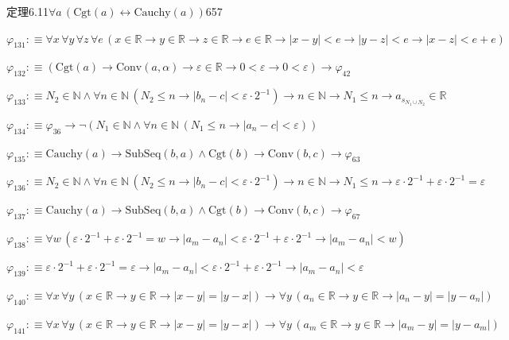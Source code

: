 \begin{fullproof}{定理6.11}{$\forall a\,(\mathrm{Cgt}(a) \leftrightarrow \mathrm{Cauchy}(a))$}{657}
\begin{abbrevlist}
\item $\varphi_{131} :\equiv \forall x\,\forall y\,\forall z\,\forall e\,(x \in \mathbb{R} \to y \in \mathbb{R} \to z \in \mathbb{R} \to e \in \mathbb{R} \to \lvert x - y \rvert < e \to \lvert y - z \rvert < e \to \lvert x - z \rvert < e + e)$
\item $\varphi_{132} :\equiv (\mathrm{Cgt}(a) \to \mathrm{Conv}(a,\alpha) \to \varepsilon \in \mathbb{R} \to 0 < \varepsilon \to 0 < \varepsilon) \to \varphi_{42}$
\item $\varphi_{133} :\equiv N_{2} \in \mathbb{N} \land \forall n \in \mathbb{N}\,(N_{2} \leq n \to \lvert b_{n} - c \rvert < \varepsilon \cdot 2^{-1}) \to n \in \mathbb{N} \to N_{1} \leq n \to a_{s_{N_{1} \cup N_{2}}} \in \mathbb{R}$
\item $\varphi_{134} :\equiv \varphi_{36} \to \neg (N_{1} \in \mathbb{N} \land \forall n \in \mathbb{N}\,(N_{1} \leq n \to \lvert a_{n} - c \rvert < \varepsilon))$
\item $\varphi_{135} :\equiv \mathrm{Cauchy}(a) \to \mathrm{SubSeq}(b,a) \land \mathrm{Cgt}(b) \to \mathrm{Conv}(b,c) \to \varphi_{63}$
\item $\varphi_{136} :\equiv N_{2} \in \mathbb{N} \land \forall n \in \mathbb{N}\,(N_{2} \leq n \to \lvert b_{n} - c \rvert < \varepsilon \cdot 2^{-1}) \to n \in \mathbb{N} \to N_{1} \leq n \to \varepsilon \cdot 2^{-1} + \varepsilon \cdot 2^{-1} = \varepsilon$
\item $\varphi_{137} :\equiv \mathrm{Cauchy}(a) \to \mathrm{SubSeq}(b,a) \land \mathrm{Cgt}(b) \to \mathrm{Conv}(b,c) \to \varphi_{67}$
\item $\varphi_{138} :\equiv \forall w\,(\varepsilon \cdot 2^{-1} + \varepsilon \cdot 2^{-1} = w \to \lvert a_{m} - a_{n} \rvert < \varepsilon \cdot 2^{-1} + \varepsilon \cdot 2^{-1} \to \lvert a_{m} - a_{n} \rvert < w)$
\item $\varphi_{139} :\equiv \varepsilon \cdot 2^{-1} + \varepsilon \cdot 2^{-1} = \varepsilon \to \lvert a_{m} - a_{n} \rvert < \varepsilon \cdot 2^{-1} + \varepsilon \cdot 2^{-1} \to \lvert a_{m} - a_{n} \rvert < \varepsilon$
\item $\varphi_{140} :\equiv \forall x\,\forall y\,(x \in \mathbb{R} \to y \in \mathbb{R} \to \lvert x - y \rvert = \lvert y - x \rvert) \to \forall y\,(a_{n} \in \mathbb{R} \to y \in \mathbb{R} \to \lvert a_{n} - y \rvert = \lvert y - a_{n} \rvert)$
\item $\varphi_{141} :\equiv \forall x\,\forall y\,(x \in \mathbb{R} \to y \in \mathbb{R} \to \lvert x - y \rvert = \lvert y - x \rvert) \to \forall y\,(a_{m} \in \mathbb{R} \to y \in \mathbb{R} \to \lvert a_{m} - y \rvert = \lvert y - a_{m} \rvert)$

\end{abbrevlist}
\end{fullproof}
